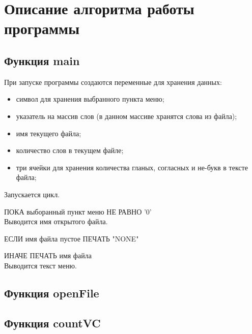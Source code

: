 \documentclass[12pt,a4paper]{article}%
\begin{document}
\section{Описание алгоритма работы программы}
\setcounter{figure}{0}
\begin{comment}
	Здесь нужно на псевдокоде или же своими словами описать основные
	шаги и операции, что выполняет программа.
\end{comment}

\subsection*{Функция main}

При запуске программы создаются переменные для хранения данных:
\begin{itemize}
	\item символ для хранения выбранного пункта меню;
	\item указатель на массив слов (в данном массиве хранятся слова из файла);
	\item имя текущего файла;
	\item количество слов в текущем файле;
	\item три ячейки для хранения количества гланых, согласных и не-букв в тексте файла;
\end{itemize}

Запускается цикл.

ПОКА выборанный пункт меню НЕ РАВНО '0'\\

Выводится имя открытого файла.

ЕСЛИ имя файла пустое ПЕЧАТЬ "NONE"

ИНАЧЕ ПЕЧАТЬ имя файла\\

Выводится текст меню.\\




\subsection*{Функция openFile}

\subsection*{Функция countVC}
\end{document}
